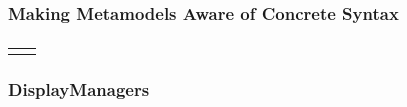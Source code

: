 \begin{frame}
  \frametitle{Making Metamodels Aware of Concrete Syntax}

  \centering
  \hspace{-1cm}
  
\end{frame}


\begin{frame}
  \frametitle{}

  \centering
  \hspace*{-1.5cm}
  \begin{tabular}{m{11.5cm}  m{5cm}}
    
     &
    
  \end{tabular}
\end{frame}



%     
%     



\begin{frame}
  \frametitle{DisplayManagers}
  \hspace{-1cm}
  \centering
  
\end{frame}


